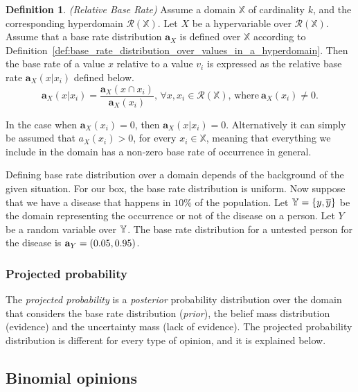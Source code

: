 \documentclass[a4paper,12pt]{article}
\theoremstyle{definition}
\newtheorem{definition}{Definition}[section]
\numberwithin{equation}{section}
\begin{document}
\begin{definition}
	\emph{(Relative Base Rate)} Assume a domain $\mathbb{X}$ of cardinality $k$, and the corresponding hyperdomain $\mathcal{R}(\mathbb{X})$. Let $X$ be a hypervariable over $\mathcal{R}(\mathbb{X})$. Assume that a base rate distribution $\mathbf{a}_X$ is defined over $\mathbb{X}$ according to Definition~\ref{def:base_rate_distribution_over_values_in_a_hyperdomain}. Then the base rate of a value $x$ relative to a value $v_i$ is expressed as the relative base rate $\mathbf{a}_X(x|x_i)$ defined below.
	\begin{equation}
		\mathbf{a}_X(x|x_i) = \dfrac{\mathbf{a}_X(x \cap x_i)}{\mathbf{a}_X(x_i)}\text{, } \forall x, x_i \in \mathcal{R}(\mathbb{X}) \text{, where}\ \mathbf{a}_X(x_i) \neq 0\text{.}
	\end{equation}

	In the case when $\mathbf{a}_X(x_i) = 0$, then $\mathbf{a}_X(x|x_i) = 0$. Alternatively it can simply be assumed that $a_X(x_i) > 0$, for every $x_i \in \mathbb{X}$, meaning that everything we include in the domain has a non-zero base rate of occurrence in general.
\end{definition}

Defining base rate distribution over a domain depends of the background of the given situation. For our box, the base rate distribution is uniform. Now suppose that we have a disease that happens in $10\%$ of the population. Let $\mathbb{Y} = \{y, \overline{y}\}$ be the domain representing the occurrence or not of the disease on a person. Let $Y$ be a random variable over $\mathbb{Y}$. The base rate distribution for a untested person for the disease is $\mathbf{a}_{Y} = (0.05, 0.95)$.

\subsubsection{Projected probability}

The \emph{projected probability} is a \emph{posterior} probability distribution over the domain that considers the base rate distribution (\emph{prior}), the belief mass distribution (evidence) and the uncertainty mass (lack of evidence). The projected probability distribution is different for every type of opinion, and it is explained below.

\subsection{Binomial opinions}
\end{document}
